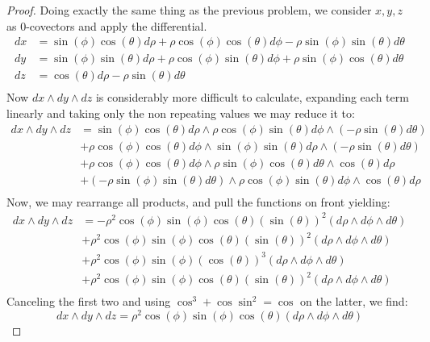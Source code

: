 \begin{problem}
\end{problem}
\begin{proof}
Doing exactly the same thing as the previous problem, we consider $x,y,z$ as 0-covectors and apply the differential.
\begin{align*}
	dx & = \sin(\phi)\cos(\theta)d\rho + \rho\cos(\phi)\cos(\theta)d\phi - \rho\sin(\phi)\sin(\theta) d\theta \\
	dy & = \sin(\phi)\sin(\theta)d\rho + \rho\cos(\phi)\sin(\theta)d\phi + \rho\sin(\phi)\cos(\theta) d\theta \\
	dz & = \cos(\theta)d\rho - \rho\sin(\theta)d\theta                                                        \\
\end{align*}
Now $dx \wedge dy \wedge dz$ is considerably more difficult to calculate, expanding each term linearly and taking only
the non repeating values we may reduce it to:
\begin{align*}
	dx \wedge dy \wedge dz & = \sin(\phi)\cos(\theta)d\rho \wedge \rho\cos(\phi)\sin(\theta)d\phi \wedge (- \rho\sin(\theta)d\theta)   \\
	                       & + \rho\cos(\phi)\cos(\theta)d\phi \wedge \sin(\phi)\sin(\theta)d\rho \wedge (- \rho\sin(\theta)d\theta)   \\
	                       & + \rho\cos(\phi)\cos(\theta)d\phi \wedge \rho\sin(\phi)\cos(\theta) d\theta \wedge \cos(\theta)d\rho      \\
	                       & + (- \rho\sin(\phi)\sin(\theta) d\theta) \wedge \rho\cos(\phi)\sin(\theta)d\phi \wedge  \cos(\theta)d\rho \\
\end{align*}
Now, we may rearrange all products, and pull the functions on front yielding:
\begin{align*}
	dx \wedge dy \wedge dz & = -\rho^2\cos(\phi)\sin(\phi)\cos(\theta)(\sin(\theta))^2  (d\rho \wedge d\phi \wedge d\theta) \\
	                       & + \rho^2\cos(\phi)\sin(\phi)\cos(\theta)(\sin(\theta))^2  (d\rho \wedge d\phi \wedge d\theta)  \\
	                       & + \rho^2\cos(\phi)\sin(\phi)(\cos(\theta))^3 (d\rho \wedge d\phi \wedge d\theta)               \\
	                       & +\rho^2\cos(\phi)\sin(\phi)\cos(\theta)(\sin(\theta))^2 (d\rho \wedge d\phi \wedge d\theta)    \\
\end{align*}
Canceling the first two and using $\cos^3 + \cos \sin^2 = \cos$ on the latter, we find:
$$ dx \wedge dy \wedge dz = \rho^2\cos(\phi)\sin(\phi)\cos(\theta) (d\rho \wedge d\phi \wedge d\theta)$$
\end
{proof}

